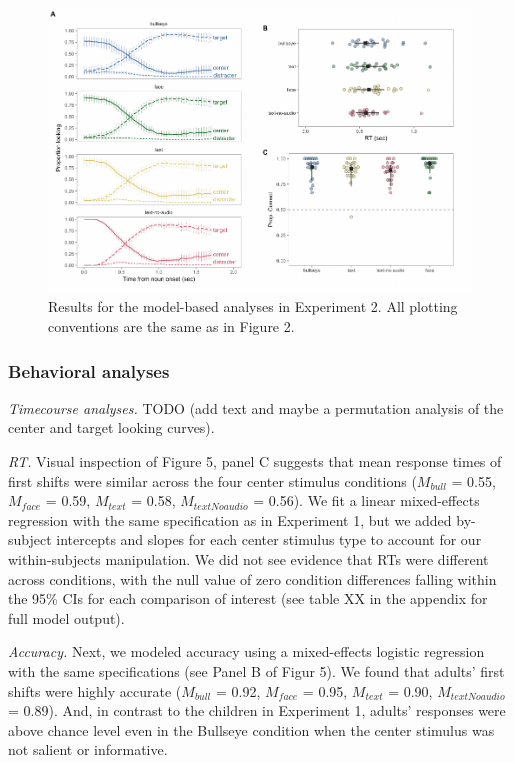 \documentclass[english,floatsintext,man]{apa6}
\theoremstyle{definition}
\theoremstyle{definition}
\theoremstyle{definition}
\theoremstyle{remark}
\begin{document}
\begin{figure}[H]

{\centering \includegraphics[width=0.9\linewidth]{figs/text-plot-1} 

}

\caption{Results for the model-based analyses in Experiment 2. All plotting conventions are the same as in Figure 2.}\label{fig:text-plot}
\end{figure}

\hypertarget{behavioral-analyses-1}{%
\subsubsection{Behavioral analyses}\label{behavioral-analyses-1}}

\emph{Timecourse analyses.} TODO (add text and maybe a permutation
analysis of the center and target looking curves).

\emph{RT.} Visual inspection of Figure 5, panel C suggests that mean
response times of first shifts were similar across the four center
stimulus conditions (\(M_{bull}\) = 0.55, \(M_{face}\) = 0.59,
\(M_{text}\) = 0.58, \(M_{textNoaudio}\) = 0.56). We fit a linear
mixed-effects regression with the same specification as in Experiment 1,
but we added by-subject intercepts and slopes for each center stimulus
type to account for our within-subjects manipulation. We did not see
evidence that RTs were different across conditions, with the null value
of zero condition differences falling within the 95\% CIs for each
comparison of interest (see table XX in the appendix for full model
output).

\emph{Accuracy.} Next, we modeled accuracy using a mixed-effects
logistic regression with the same specifications (see Panel B of Figur
5). We found that adults' first shifts were highly accurate
(\(M_{bull}\) = 0.92, \(M_{face}\) = 0.95, \(M_{text}\) = 0.90,
\(M_{textNoaudio}\) = 0.89). And, in contrast to the children in
Experiment 1, adults' responses were above chance level even in the
Bullseye condition when the center stimulus was not salient or
informative.
\end{document}
